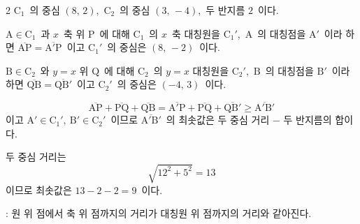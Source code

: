 \documentclass[10pt,fleqn]{article}
\begin{document}
\begin{multicols*}{2}
$\mathrm{C}_1$\ 의 중심 $(8,\, 2)$,\ $\mathrm{C}_2$\ 의 중심 $(3,\, -4)$,\ 두 반지름 $2$\ 이다.

$\mathrm{A} \in \mathrm{C}_1$\ 과 $x$\ 축 위 $\mathrm{P}$\ 에 대해 $\mathrm{C}_1$\ 의 $x$\ 축 대칭원을 $\mathrm{C}_1'$,\ $\mathrm{A}$\ 의 대칭점을 $\mathrm{A}'$\ 이라 하면 $\overline{\mathrm{AP}} = \overline{\mathrm{A}'\mathrm{P}}$\ 이고 $\mathrm{C}_1'$\ 의 중심은 $(8,\, -2)$\ 이다.

$\mathrm{B} \in \mathrm{C}_2$\ 와 $y = x$ 위 $\mathrm{Q}$\ 에 대해 $\mathrm{C}_2$\ 의 $y = x$ 대칭원을 $\mathrm{C}_2'$,\ $\mathrm{B}$\ 의 대칭점을 $\mathrm{B}'$\ 이라 하면 $\overline{\mathrm{QB}} = \overline{\mathrm{QB}'}$\ 이고 $\mathrm{C}_2'$\ 의 중심은 $(-4,\, 3)$\ 이다.

\[ \overline{\mathrm{AP}} + \overline{\mathrm{PQ}} + \overline{\mathrm{QB}} = \overline{\mathrm{A}'\mathrm{P}} + \overline{\mathrm{PQ}} + \overline{\mathrm{QB}'} \ge \overline{\mathrm{A}'\mathrm{B}'} \]
이고 $\mathrm{A}' \in \mathrm{C}_1',\ \mathrm{B}' \in \mathrm{C}_2'$\ 이므로 $\overline{\mathrm{A}'\mathrm{B}'}$\ 의 최솟값은 두 중심 거리 $-$ 두 반지름의 합이다.

두 중심 거리는
\[ \sqrt{12^2 + 5^2} = 13 \]
이므로 최솟값은 $13 - 2 - 2 = 9$\ 이다.

\begin{dmcriticalpoint}
: 원 위 점에서 축 위 점까지의 거리가 대칭원 위 점까지의 거리와 같아진다.
\end{dmcriticalpoint}

\end{multicols*}
\end{document}
